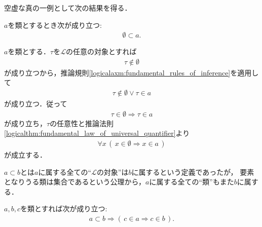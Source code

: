 	空虚な真の一例として次の結果を得る．
	
	\begin{screen}
		\begin{thm}[空集合は全ての類に含まれる]\label{thm:emptyset_if_a_subset_of_every_class}
			$a$を類とするとき次が成り立つ:
			\begin{align}
				\emptyset \subset a.
			\end{align}
		\end{thm}
	\end{screen}
	
	\begin{prf}
		$a$を類とする．$\tau$を$\mathcal{L}$の任意の対象とすれば
		\begin{align}
			\tau \notin \emptyset
		\end{align}
		が成り立つから，推論規則\ref{logicalaxm:fundamental_rules_of_inference}を適用して
		\begin{align}
			\tau \notin \emptyset \vee \tau \in a
		\end{align}
		が成り立つ．従って
		\begin{align}
			\tau \in \emptyset \Longrightarrow \tau \in a
		\end{align}
		が成り立ち，$\tau$の任意性と推論法則\ref{logicalthm:fundamental_law_of_universal_quantifier}より
		\begin{align}
			\forall x\, (\, x \in \emptyset \Longrightarrow x \in a\, )
		\end{align}
		が成立する．
		\QED
	\end{prf}
	
	$a \subset b$とは$a$に属する全ての``$\mathcal{L}$の対象''は$b$に属するという定義であったが，
	要素となりうる類は集合であるという公理から，$a$に属する全ての``類''もまた$b$に属する．
	
	\begin{screen}
		\begin{thm}[類はその部分類に属する全ての類を要素に持つ]\label{thm:subclass_contains_all_elements}
			$a,b,c$を類とすれば次が成り立つ:
			\begin{align}
				a \subset b \Longrightarrow (\, c \in a \Longrightarrow c \in b\, ).
			\end{align}
		\end{thm}
	\end{screen}
	
